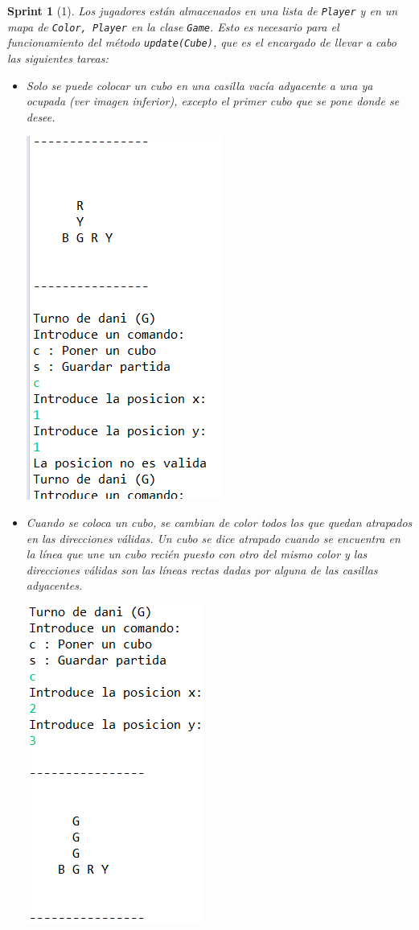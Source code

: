 \documentclass[12pt,a4paper,openright]{book}
\theoremstyle{break}
\newtheorem*{sprint}{Sprint}
\begin{document}
\begin{sprint}[1]
Los jugadores están almacenados en una lista de \texttt{Player} y en un mapa de \texttt{Color, Player} en la clase \texttt{Game}. Esto es necesario para el funcionamiento del método \texttt{update(Cube)}, que es el encargado de llevar a cabo las siguientes tareas:
\begin{itemize}
\item Solo se puede colocar un cubo en una casilla vacía adyacente a una ya ocupada (ver imagen inferior), excepto el primer cubo que se pone donde se desee.
\begin{center}
\includegraphics[scale=0.8]{pos-no-validaS1.png}
\end{center}

\item Cuando se coloca un cubo, se cambian de color todos los que quedan atrapados en las direcciones válidas. Un cubo se dice atrapado cuando se encuentra en la línea que une un cubo recién puesto con otro del mismo color y las direcciones válidas son las líneas rectas dadas por alguna de las casillas adyacentes.
\begin{center}
\includegraphics[scale=0.8]{atrapadaaaaaaaas.png}
\end{center}


\end{itemize}
\end{sprint}
\end{document}

